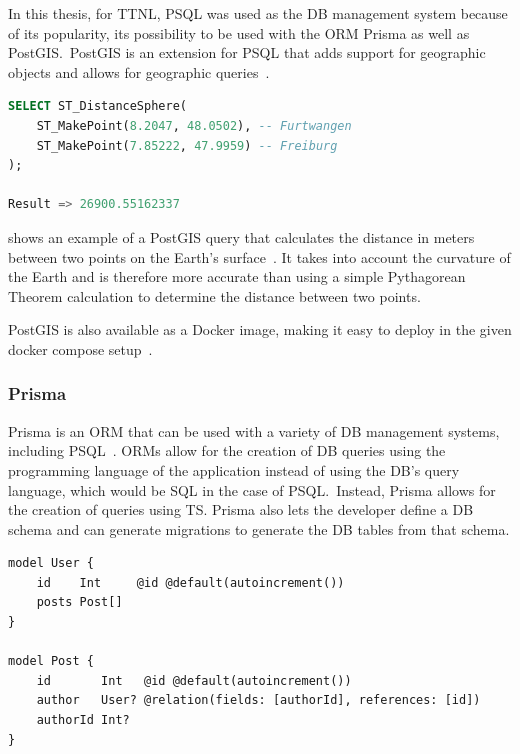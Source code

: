In this thesis, for \ac{TTNL}, \ac{PSQL} was used as the \ac{DB} management system because of its popularity, its possibility to be used with the \ac{ORM} Prisma as well as PostGIS.\
PostGIS is an extension for \ac{PSQL} that adds support for geographic objects and allows for geographic queries~\cite{postgis_psc__osgeo_postgis_2023}.

\begin{lstlisting}[language=SQL, float, caption={Example of a PostGIS query to calculate the distance between two geolocation points in meters}, label={lst:postgis-example-distance}]
SELECT ST_DistanceSphere(
    ST_MakePoint(8.2047, 48.0502), -- Furtwangen
    ST_MakePoint(7.85222, 47.9959) -- Freiburg
);

Result => 26900.55162337
\end{lstlisting}

 shows an example of a PostGIS query that calculates the distance in meters between two points on the Earth's surface~\cite{postgis_psc__osgeo_st_distancesphere_nodate}.
It takes into account the curvature of the Earth and is therefore more accurate than using a simple Pythagorean Theorem calculation to determine the distance between two points.

PostGIS is also available as a Docker image, making it easy to deploy in the given docker compose setup~\cite{docker_inc_postgispostgis_2023}.

\subsubsection{Prisma}

Prisma is an \ac{ORM} that can be used with a variety of \ac{DB} management systems, including \ac{PSQL}~\cite{prisma_data_inc_prisma_2023}.
\acp{ORM} allow for the creation of \ac{DB} queries using the programming language of the application instead of using the \ac{DB}'s query language, which would be \ac{SQL} in the case of \ac{PSQL}.\
Instead, Prisma allows for the creation of queries using \ac{TS}.
Prisma also lets the developer define a \ac{DB} schema and can generate migrations to generate the \ac{DB} tables from that schema.

\begin{lstlisting}[float, caption={Example of a Prisma schema}, label={lst:prisma-schema-example}]
model User {
    id    Int     @id @default(autoincrement())
    posts Post[]
}
    
model Post {
    id       Int   @id @default(autoincrement())
    author   User? @relation(fields: [authorId], references: [id])
    authorId Int?
}
\end{lstlisting}

